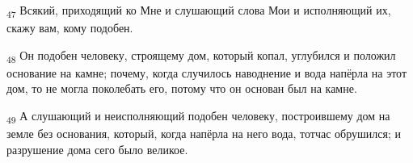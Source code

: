 \begin{tcolorbox}
\textsubscript{47} Всякий, приходящий ко Мне и слушающий слова Мои и исполняющий их, скажу вам, кому подобен.
\end{tcolorbox}
\begin{tcolorbox}
\textsubscript{48} Он подобен человеку, строящему дом, который копал, углубился и положил основание на камне; почему, когда случилось наводнение и вода напёрла на этот дом, то не могла поколебать его, потому что он основан был на камне.
\end{tcolorbox}
\begin{tcolorbox}
\textsubscript{49} А слушающий и неисполняющий подобен человеку, построившему дом на земле без основания, который, когда напёрла на него вода, тотчас обрушился; и разрушение дома сего было великое.
\end{tcolorbox}
